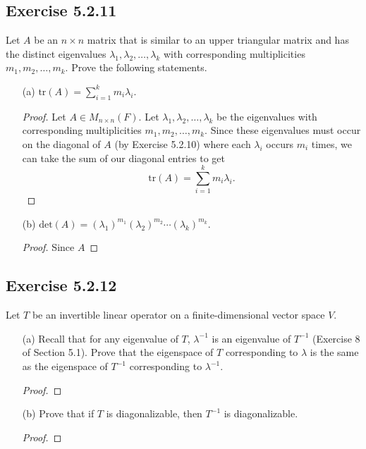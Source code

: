 \subsection*{Exercise 5.2.11} Let \( A  \) be an \( n \times n  \) matrix that is similar to an upper triangular matrix and has the distinct eigenvalues \( {\lambda}_{1}, {\lambda}_{2}, \dots, {\lambda}_{k} \) with corresponding multiplicities \( {m}_{1}, {m}_{2}, \dots, {m}_{k } \). Prove the following statements. 
\begin{enumerate}
    \item[(a)] \( \text{tr}(A) = \sum_{ i=1  }^{ k  } {m}_{i} {\lambda}_{i} \).
        \begin{proof}
            Let \( A \in {M}_{n \times n}(F) \). Let \( {\lambda}_{1}, {\lambda}_{2}, \dots, {\lambda}_{k } \) be the eigenvalues with corresponding multiplicities \( {m}_{1}, {m}_{2}, \dots, {m}_{k } \). Since these eigenvalues must occur on the diagonal of \( A  \) (by Exercise 5.2.10) where each \( {\lambda}_{i} \) occurs \( {m}_{i}  \) times, we can take the sum of our diagonal entries to get
            \[  \text{tr}(A) = \sum_{ i=1 }^{ k   } {m}_{i} {\lambda}_{i}. \]
        \end{proof}
    \item[(b)] \( \text{det}(A) = ({\lambda}_{1})^{{m}_{1}} ({\lambda}_{2})^{{m}_{2}} \cdots ({\lambda}_{k})^{{m}_{k}} \).
        \begin{proof}
        Since \( A  \)
        \end{proof}
\end{enumerate}

\subsection*{Exercise 5.2.12} Let \( T  \) be an invertible linear operator on a finite-dimensional vector space \( V  \). 
\begin{enumerate}
    \item[(a)] Recall that for any eigenvalue of \( T  \), \( \lambda^{-1} \) is an eigenvalue of \( T^{-1} \) (Exercise 8 of Section 5.1). Prove that the eigenspace of \( T  \) corresponding to \( \lambda  \) is the same as the eigenspace of \( T^{-1} \) corresponding to \( \lambda^{-1} \). %
        \begin{proof}

        \end{proof}
    \item[(b)] Prove that if \( T  \) is diagonalizable, then \( T^{-1} \) is diagonalizable.
        \begin{proof}
        
        \end{proof}
\end{enumerate}


